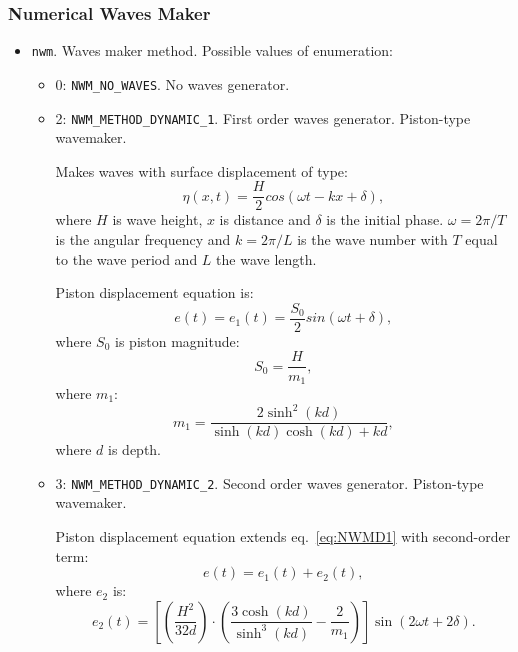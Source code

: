 \subsubsection{Numerical Waves Maker}
\begin{itemize}
    \item \verb|nwm|. Waves maker method. Possible values of enumeration:
    \begin{itemize}
        \item 0: \verb|NWM_NO_WAVES|. No waves generator.
        \item 2: \verb|NWM_METHOD_DYNAMIC_1|. First order waves generator. Piston-type wavemaker. 

        Makes waves with surface displacement of type:
        \begin{equation}
            \eta(x, t) = \frac{H}{2}cos(\omega t - kx + \delta),
        \end{equation}
        where $H$ is wave height, $x$ is distance and $\delta$ is the initial phase.
        $\omega = 2\pi/T$ is the angular frequency and $k=2\pi/L$ is the wave number with $T$ equal to the wave period and $L$ the wave length.

        Piston displacement equation is:
        \begin{equation}\label{eq:NWMD1}
            e(t) = e_{1}(t) = \frac{S_{0}}{2} sin(\omega t + \delta),
        \end{equation}
        where $S_{0}$ is piston magnitude:
        \begin{equation}
            S_{0} = \frac{H}{m_{1}},
        \end{equation}
        where $m_{1}$:
        \begin{equation}
            m_{1} = \frac
            {2\sinh^{2}(kd)}
            {\sinh(kd)\cosh(kd) + kd},
        \end{equation}
        where $d$ is depth.

        \item 3: \verb|NWM_METHOD_DYNAMIC_2|. Second order waves generator. Piston-type wavemaker.

        Piston displacement equation extends eq.~\ref{eq:NWMD1} with second-order term:
        \begin{equation}
            e(t) = e_{1}(t) + e_{2}(t),
        \end{equation}
        where $e_{2}$ is:
        \begin{equation}
            e_{2}(t) = \left[
            \left(
            \frac{H^{2}}{32d}
            \right)
            \cdot
            \left(
            \frac{3\cosh(kd)}{\sinh^{3}(kd)} - \frac{2}{m_{1}}
            \right)
            \right]
            \sin(2\omega t + 2\delta).
        \end{equation}
        

\end{itemize}
\end{itemize}
